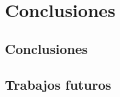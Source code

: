 \chapter{Conclusiones}\label{cap.conclusiones}

\section{Conclusiones}

\section{Trabajos futuros}



